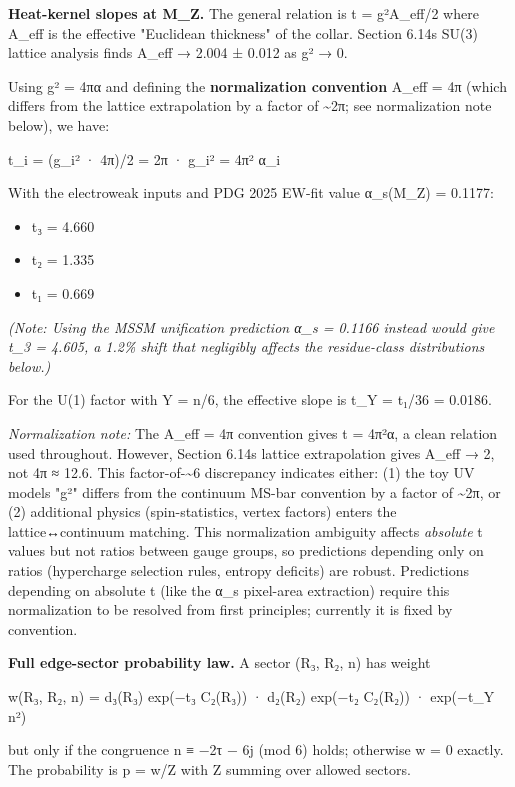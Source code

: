 \textbf{Heat-kernel slopes at M\_Z.} The general relation is t = g²A\_eff/2 where A\_eff is the effective "Euclidean thickness" of the collar. Section 6.14\textquotesingle s SU(3) lattice analysis finds A\_eff → 2.004 ± 0.012 as g² → 0.

Using g² = 4πα and defining the \textbf{normalization convention} A\_eff = 4π (which differs from the lattice extrapolation by a factor of \textasciitilde2π; see normalization note below), we have:

t\_i = (g\_i² · 4π)/2 = 2π · g\_i² = 4π² α\_i

With the electroweak inputs and PDG 2025 EW-fit value α\_s(M\_Z) = 0.1177:

\begin{itemize}
\tightlist
\item
  t₃ = 4.660
\item
  t₂ = 1.335
\item
  t₁ = 0.669
\end{itemize}

\emph{(Note: Using the MSSM unification prediction α\_s = 0.1166 instead would give t\_3 = 4.605, a 1.2\% shift that negligibly affects the residue-class distributions below.)}

For the U(1) factor with Y = n/6, the effective slope is t\_Y = t₁/36 = 0.0186.

\emph{Normalization note:} The A\_eff = 4π convention gives t = 4π²α, a clean relation used throughout. However, Section 6.14\textquotesingle s lattice extrapolation gives A\_eff → 2, not 4π ≈ 12.6. This factor-of-\textasciitilde6 discrepancy indicates either: (1) the toy UV model\textquotesingle s "g²" differs from the continuum MS-bar convention by a factor of \textasciitilde2π, or (2) additional physics (spin-statistics, vertex factors) enters the lattice↔continuum matching. This normalization ambiguity affects \emph{absolute} t values but not ratios between gauge groups, so predictions depending only on ratios (hypercharge selection rules, entropy deficits) are robust. Predictions depending on absolute t (like the α\_s pixel-area extraction) require this normalization to be resolved from first principles; currently it is fixed by convention.

\textbf{Full edge-sector probability law.} A sector (R₃, R₂, n) has weight

w(R₃, R₂, n) = d₃(R₃) exp(−t₃ C₂(R₃)) · d₂(R₂) exp(−t₂ C₂(R₂)) · exp(−t\_Y n²)

but only if the congruence n ≡ −2τ − 6j (mod 6) holds; otherwise w = 0 exactly. The probability is p = w/Z with Z summing over allowed sectors.

